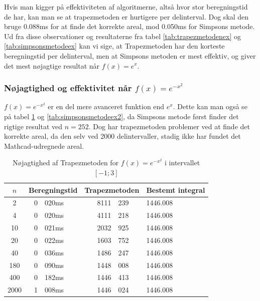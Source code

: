 \documentclass[12pt]{article}
\numberwithin{equation}{section}
\begin{document}
Hvis man kigger på effektiviteten af algoritmerne, altså hvor stor beregningstid de har, kan man se at trapezmetoden er hurtigere per delinterval. Dog skal den bruge 0.088ms for at finde det korrekte areal, mod 0.050ms for Simpsons metode.
\\
Ud fra disse observationer og resultaterne fra tabel \ref{tab:trapezmetodenex} og \ref{tab:simpsonsmetodeex} kan vi sige, at Trapezmetoden har den korteste beregningstid per delinterval, men at Simpsons metoden er mest effektiv, og giver det mest nøjagtige resultat når $f(x)=e^x$.

\subsubsection{Nøjagtighed og effektivitet når $f(x)=e^{-x^2}$}
$f(x)=e^{-x^2}$ er en del mere avanceret funktion end $e^x$. Dette kan man også se på tabel \ref{tab:trapezmetodenex2} og \ref{tab:simpsonsmetodeex2}, da Simpsons metode først finder det rigtige resultat ved $n=252$. Dog har trapezmetoden problemer ved at finde det korrekte areal, da den selv ved 2000 delintervaller, stadig ikke har fundet det Mathcad-udregnede areal.
\begin{table}[H]
	\caption {Nøjagtighed af Trapezmetoden for $f(x)=e^{-x^2}$ i intervallet $[-1;3]$} 
	\label{tab:trapezmetodenex2}
	\begin{center}
		\begin{tabular}{|c|r@{.}l|r @{.} l|l|}
			\hline $n$ & \multicolumn{2}{|c|}{Beregningstid} & \multicolumn{2}{|c|}{Trapezmetoden} & Bestemt integral
			\\
			\hline 2 & 0&020ms & 8111&239 & 1446.008\\ 
			\hline 4 & 0&020ms & 4111&218 & 1446.008\\ 
			\hline 10 & 0&021ms & 2032&925 & 1446.008\\ 
			\hline 20 & 0&022ms & 1603&752 & 1446.008\\ 
			\hline 40 & 0&036ms & 1486&247 & 1446.008\\ 
			\hline 180 & 0&090ms & 1448&008 & 1446.008\\
			\hline 400 & 0&182ms & 1446&413 & 1446.008\\
			\hline 2000 & 1&008ms & 1446&024 & 1446.008\\
			\hline
		\end{tabular}
	\end{center}
\end{table}
\end{document}
